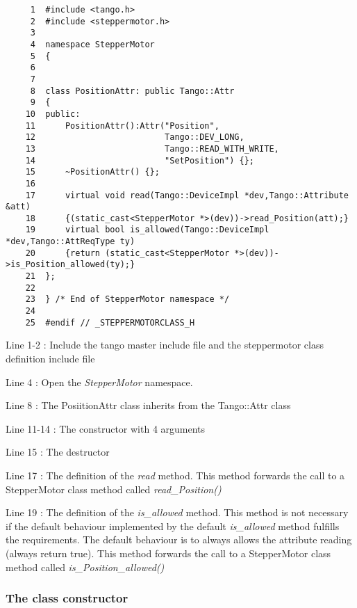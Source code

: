 \begin{verbatim}
     1  #include <tango.h>
     2  #include <steppermotor.h>
     3  
     4  namespace StepperMotor
     5  {
     6  
     7  
     8  class PositionAttr: public Tango::Attr
     9  {
    10  public:
    11      PositionAttr():Attr("Position",
    12                          Tango::DEV_LONG,
    13                          Tango::READ_WITH_WRITE,
    14                          "SetPosition") {};
    15      ~PositionAttr() {};
    16          
    17      virtual void read(Tango::DeviceImpl *dev,Tango::Attribute &att)
    18      {(static_cast<StepperMotor *>(dev))->read_Position(att);}
    19      virtual bool is_allowed(Tango::DeviceImpl *dev,Tango::AttReqType ty)
    20      {return (static_cast<StepperMotor *>(dev))->is_Position_allowed(ty);}
    21  };
    22  
    23  } /* End of StepperMotor namespace */
    24  
    25  #endif // _STEPPERMOTORCLASS_H
\end{verbatim}




Line 1-2 : Include the tango master include file and the steppermotor
class definition include file

Line 4 : Open the \emph{StepperMotor} namespace.

Line 8 : The PosiitionAttr class inherits from the Tango::Attr class

Line 11-14 : The constructor with 4 arguments

Line 15 : The destructor

Line 17 : The definition of the \emph{read} method. This method forwards
the call to a StepperMotor class method called \emph{read\_Position()}

Line 19 : The definition of the \emph{is\_allowed}
method. This method is not necessary if the default behaviour implemented
by the default \emph{is\_allowed} method fulfills the requirements.
The default behaviour is to always allows the attribute reading (always
return true). This method forwards the call to a StepperMotor class
method called \emph{is\_Position\_allowed()}


\subsubsection{The class constructor}

